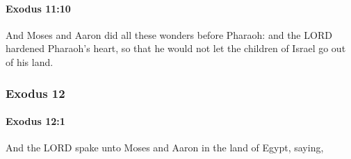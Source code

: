 		\paragraph{Exodus 11:10} %
			\label{EXODUS-11-10}

			And Moses and Aaron did all these wonders before Pharaoh: and the LORD hardened Pharaoh's heart, so that he would not let the children of Israel go out of his land.

	\subsubsection{Exodus 12} %
		\label{EXODUS-12}

		\paragraph{Exodus 12:1} %
			\label{EXODUS-12-1}

			And the LORD spake unto Moses and Aaron in the land of Egypt, saying,

